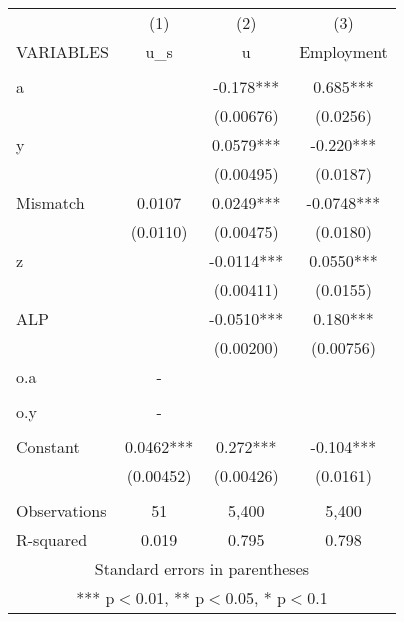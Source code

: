 \documentclass[]{article}
\begin{document}
\begin{tabular}{lccc} \hline
 & (1) & (2) & (3) \\
VARIABLES & u\_s & u & Employment \\ \hline
 &  &  &  \\
a &  & -0.178*** & 0.685*** \\
 &  & (0.00676) & (0.0256) \\
y &  & 0.0579*** & -0.220*** \\
 &  & (0.00495) & (0.0187) \\
Mismatch & 0.0107 & 0.0249*** & -0.0748*** \\
 & (0.0110) & (0.00475) & (0.0180) \\
z &  & -0.0114*** & 0.0550*** \\
 &  & (0.00411) & (0.0155) \\
ALP &  & -0.0510*** & 0.180*** \\
 &  & (0.00200) & (0.00756) \\
o.a & - &  &  \\
 &  &  &  \\
o.y & - &  &  \\
 &  &  &  \\
Constant & 0.0462*** & 0.272*** & -0.104*** \\
 & (0.00452) & (0.00426) & (0.0161) \\
 &  &  &  \\
Observations & 51 & 5,400 & 5,400 \\
 R-squared & 0.019 & 0.795 & 0.798 \\ \hline
\multicolumn{4}{c}{ Standard errors in parentheses} \\
\multicolumn{4}{c}{ *** p$<$0.01, ** p$<$0.05, * p$<$0.1} \\
\end{tabular}
\end{document}
